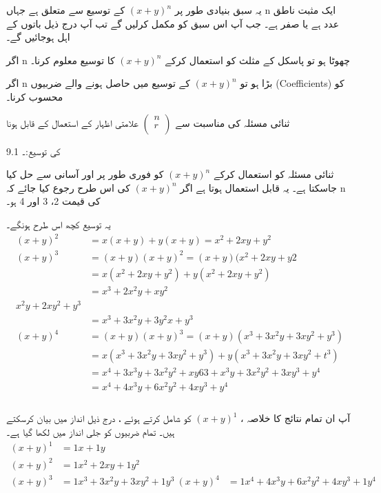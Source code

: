 

یہ سبق بنیادی طور پر
\((x+y)^{n}\)
کے توسیع  سے متعلق ہے جہاں n ایک مثبت ناطق عدد ہے یا صفر ہے۔  جب آپ اس سبق کو مکمل کرلیں گے تب آپ درج ذیل باتوں کے اہل ہوجائیں گے۔

 اگر n چھوٹا ہو تو پاسکل کے مثلث کو استعمال کرکے 
\((x+y)^{n}\)
کا  توسیع معلوم کرنا۔ 

اگر n بڑا ہو تو 
\((x+y)^{n}\)
کے  توسیع میں  حاصل ہونے والے ضربیوں (Coefficients)  کو محسوب کرنا۔

ثنائی مسئلہ کی مناسبت سے 
\(\begin{pmatrix}
n\\
r\\
\end{pmatrix}\) 
علامتی اظہار کے استعمال کے قابل ہونا

9.1
کی  توسیع:۔

ثنائی مسئلہ کو استعمال کرکے  
\((x+y)^{n}\) 
 کو فوری طور پر اور آسانی سے حل کیا جاسکتا ہے۔ یہ قابل استعمال ہوتا ہے اگر 
\((x+y)^{n}\) 
کی اس طرح رجوع کیا جائے  کہ n کی قیمت  2، 3 اور 4 ہو۔

یہ توسیع  کچھ اس طرح ہونگے۔ 
\begin{align*}
   (x+y)^{2}&=x(x+y)+y(x+y)=x^{2}+2xy+y^{2}\\
   (x+y)^{3}&=(x+y)(x+y)^{2}=(x+y)(x^{2}+2xy+y{2}\\
      &=x(x^{2}+2xy+y^{2})+y(x^{2}+2xy+y^{2})\\
  &=x^{3}+2x^{2}y+xy^{2}\\
  x^{2}y+2xy^{2}+y^{3}\\
  &=x^{3}+3x^{2}y+3y^{2}x+y^{3}\\
  (x+y)^{4}&=(x+y)(x+y)^{3}=(x+y)(x^{3}+3x^{2}y+3xy^{2}+y^{3})\\
   &=x(x^{3}+3x^{2}y+3xy^{2}+y^{3})+y(x^{3}+3x^{2}y+3xy^{2}+t^{3})\\
   &=x^{4}+3x^{3}y+3x^{2}y^{2}+xy6{3}+x^{3}y+3x^{2}y^{2}+3xy^{3}+y^{4}\\
   &=x^{4}+4x^{3}y+6x^{2}y^{2}+4xy^{3}+y^{4}\\
   \end{align*}
\\
آپ ان تمام نتائج کا خلاصہ ، 
   \((x+y)^{1}\)
کو شامل کرتے ہوئے ،    درج ذیل انداز میں بیان کرسکتے ہیں۔  تمام ضربیوں کو  جلی  انداز میں  لکھا گیا ہے۔ 
  \begin{align*}
   (x+y)^{1}&=1x+1y\\
   (x+y)^{2}&=1x^{2}+2xy+1y^{2}\\
   (x+y)^{3}&=1x^{3}+3x^{2}y+3xy^{2}+1y^{3}\
   (x+y)^{4}&=1x^{4}+4x^{3}y+6x^{2}y^{2}+4xy^{3}+1y^{4}\\
   \end{align*}
   
